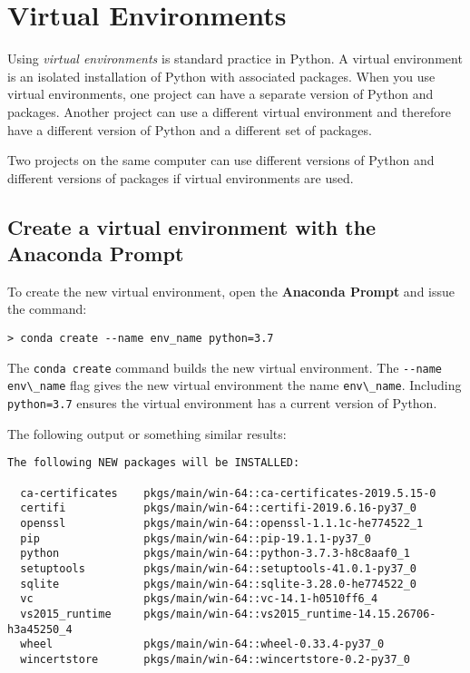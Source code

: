 \documentclass{book}
\newcommand{\passthrough}[1]{#1}
\begin{document}
    
        \hypertarget{virtual-environments}{%
\section{Virtual Environments}\label{virtual-environments}}
    




    
        Using \emph{virtual environments} is standard practice in Python. A
virtual environment is an isolated installation of Python with
associated packages. When you use virtual environments, one project can
have a separate version of Python and packages. Another project can use
a different virtual environment and therefore have a different version
of Python and a different set of packages.

Two projects on the same computer can use different versions of Python
and different versions of packages if virtual environments are used.
    




    
        \hypertarget{create-a-virtual-environment-with-the-anaconda-prompt}{%
\subsection{Create a virtual environment with the Anaconda
Prompt}\label{create-a-virtual-environment-with-the-anaconda-prompt}}

To create the new virtual environment, open the \textbf{Anaconda Prompt}
and issue the command:

\begin{lstlisting}
> conda create --name env_name python=3.7
\end{lstlisting}

The \passthrough{\lstinline!conda create!} command builds the new
virtual environment. The \passthrough{\lstinline!--name env\_name!} flag
gives the new virtual environment the name
\passthrough{\lstinline!env\_name!}. Including
\passthrough{\lstinline!python=3.7!} ensures the virtual environment has
a current version of Python.

The following output or something similar results:

\begin{lstlisting}
The following NEW packages will be INSTALLED:

  ca-certificates    pkgs/main/win-64::ca-certificates-2019.5.15-0
  certifi            pkgs/main/win-64::certifi-2019.6.16-py37_0
  openssl            pkgs/main/win-64::openssl-1.1.1c-he774522_1
  pip                pkgs/main/win-64::pip-19.1.1-py37_0
  python             pkgs/main/win-64::python-3.7.3-h8c8aaf0_1
  setuptools         pkgs/main/win-64::setuptools-41.0.1-py37_0
  sqlite             pkgs/main/win-64::sqlite-3.28.0-he774522_0
  vc                 pkgs/main/win-64::vc-14.1-h0510ff6_4
  vs2015_runtime     pkgs/main/win-64::vs2015_runtime-14.15.26706-h3a45250_4
  wheel              pkgs/main/win-64::wheel-0.33.4-py37_0
  wincertstore       pkgs/main/win-64::wincertstore-0.2-py37_0
\end{lstlisting}
\end{document}
